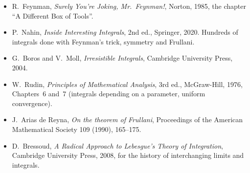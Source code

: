 \begin{itemize}
\item R.~Feynman, \emph{Surely You're Joking, Mr.~Feynman!}, Norton, 1985, the chapter ``A Different Box of Tools''.
\item P.~Nahin, \emph{Inside Interesting Integrals}, 2nd ed., Springer, 2020. Hundreds of integrals done with Feynman's trick,
symmetry and Frullani.
\item G.~Boros and V.~Moll, \emph{Irresistible Integrals}, Cambridge University Press, 2004.
\item W.~Rudin, \emph{Principles of Mathematical Analysis}, 3rd ed., McGraw-Hill, 1976, Chapters~6 and~7 (integrals depending
on a parameter, uniform convergence).
\item J.~Arias de Reyna, \emph{On the theorem of Frullani}, Proceedings of the American Mathematical Society 109 (1990),
165--175.
\item D.~Bressoud, \emph{A Radical Approach to Lebesgue's Theory of Integration}, Cambridge University Press, 2008, for the
history of interchanging limits and integrals.
\end{itemize}
